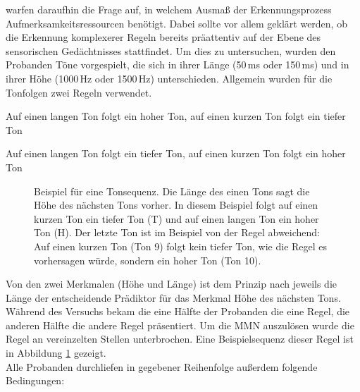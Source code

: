 \documentclass[doc,a4paper,12pt]{apa6}
\begin{document}
\textcite{paavilainen2007preattentive} warfen daraufhin die Frage auf, in welchem Ausmaß der Erkennungsprozess Aufmerksamkeitsressourcen benötigt. Dabei sollte vor allem geklärt werden, ob die Erkennung komplexerer Regeln bereits präattentiv auf der Ebene des sensorischen Gedächtnisses stattfindet. Um dies zu untersuchen, wurden den Probanden Töne vorgespielt, die sich in ihrer Länge (50\,ms oder 150\,ms) und in ihrer Höhe (1000\,Hz oder 1500\,Hz) unterschieden. Allgemein wurden für die Tonfolgen zwei Regeln verwendet.

\begin{compactitem}
  \item Auf einen langen Ton folgt ein hoher Ton, auf einen kurzen Ton folgt ein tiefer
Ton
  \item Auf einen langen Ton folgt ein tiefer Ton, auf einen kurzen Ton folgt ein hoher
Ton
\end{compactitem}

\begin{figure}[t]
  \centering
  \begin{minipage}{\textwidth}
    \setlength{\fboxsep}{.05\textwidth}
    \vspace{10pt}
    \caption{Beispiel für eine Tonsequenz. Die Länge des einen Tons sagt die Höhe des nächsten Tons vorher. In diesem Beispiel folgt auf einen kurzen Ton ein tiefer Ton (T) und auf einen langen Ton ein hoher Ton (H). Der letzte Ton ist im Beispiel von der Regel abweichend: Auf einen kurzen Ton (Ton 9) folgt kein tiefer Ton, wie die Regel es vorhersagen würde, sondern ein hoher Ton (Ton 10).}
    \label{stimuli}
  \end{minipage}
\end{figure}

Von den zwei Merkmalen (Höhe und Länge) ist dem Prinzip nach jeweils die Länge der entscheidende Prädiktor für das Merkmal Höhe des nächsten Tons. Während des Versuchs bekam die eine Hälfte der Probanden die eine Regel, die anderen Hälfte die andere Regel präsentiert. Um die MMN auszulösen wurde die Regel an vereinzelten Stellen unterbrochen. Eine Beispielsequenz dieser Regel ist in Abbildung \ref{stimuli} gezeigt.\\
Alle Probanden durchliefen in gegebener Reihenfolge außerdem folgende Bedingungen:
\end{document}
